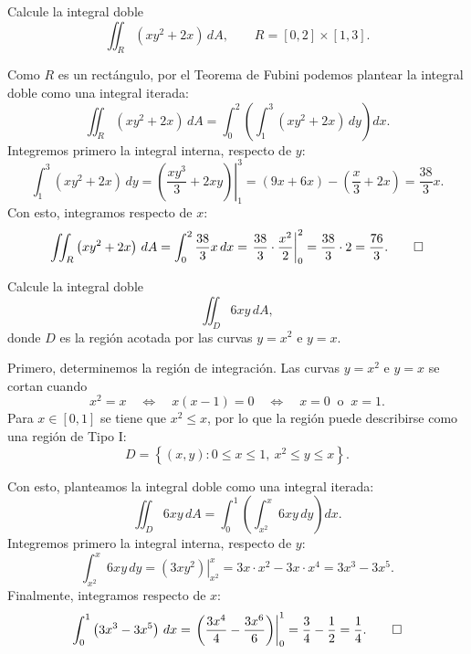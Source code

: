 \documentclass[11pt,respuestas,a4]{aleph-examen}
\begin{document}
\encabezado


\begin{preguntas}

\item
Calcule la integral doble
\[
    \iint_R \left(xy^2 + 2x\right)\,dA,
    \qquad
    R = [0,2]\times[1,3].
\]

\begin{respuesta}
Como $R$ es un rectángulo, por el Teorema de Fubini podemos plantear la integral doble como una integral iterada:
\[
    \iint_R \left(xy^2 + 2x\right)\,dA
    =
    \int_0^2 \left(\int_1^3 \left(xy^2 + 2x\right)\,dy\right) dx.
\]
Integremos primero la integral interna, respecto de $y$:
\[
    \int_1^3 \left(xy^2 + 2x\right)\,dy
    =
    \left.\left(\frac{xy^3}{3} + 2xy\right)\right|_1^3
    =
    \left(9x + 6x\right) - \left(\frac{x}{3} + 2x\right)
    =
    \frac{38}{3}x.
\]
Con esto, integramos respecto de $x$:
\[
    \iint_R \left(xy^2 + 2x\right)\,dA
    =
    \int_0^2 \frac{38}{3}x\,dx
    =
    \left.\frac{38}{3}\cdot\frac{x^2}{2}\right|_0^2
    =
    \frac{38}{3}\cdot 2
    =
    \frac{76}{3}.\qedhere
\]
\end{respuesta}


\item
Calcule la integral doble
\[
    \iint_D 6xy\,dA,
\]
donde $D$ es la región acotada por las curvas $y = x^2$ e $y = x$.

\begin{respuesta}
Primero, determinemos la región de integración. Las curvas $y=x^2$ e $y=x$ se cortan cuando
\[
    x^2 = x
    \quad\Longleftrightarrow\quad
    x(x-1) = 0
    \quad\Longleftrightarrow\quad
    x = 0 \ \text{ o }\ x = 1.
\]
Para $x\in[0,1]$ se tiene que $x^2 \le x$, por lo que la región puede describirse como una región de Tipo I:
\[
    D = \left\{(x,y) : 0\le x\le 1,\ x^2 \le y \le x\right\}.
\]
\begin{center}
\end{center}
Con esto, planteamos la integral doble como una integral iterada:
\[
    \iint_D 6xy\,dA
    =
    \int_0^1 \left(\int_{x^2}^{x} 6xy\,dy\right) dx.
\]
Integremos primero la integral interna, respecto de $y$:
\[
    \int_{x^2}^{x} 6xy\,dy
    =
    \left.\left(3xy^2\right)\right|_{x^2}^{x}
    =
    3x\cdot x^2 - 3x\cdot x^4
    =
    3x^3 - 3x^5.
\]
Finalmente, integramos respecto de $x$:
\[
    \int_0^1 \left(3x^3 - 3x^5\right)\,dx
    =
    \left.\left(\frac{3x^4}{4} - \frac{3x^6}{6}\right)\right|_0^1
    =
    \frac{3}{4} - \frac{1}{2}
    =
    \frac{1}{4}.\qedhere
\]
\end{respuesta}



\end{preguntas}
\end{document}

